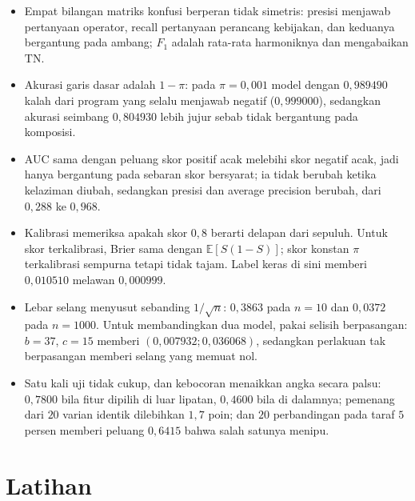 \begin{ringkasan}
\begin{itemize}
  \item Empat bilangan matriks konfusi berperan tidak simetris: presisi menjawab
        pertanyaan operator, recall pertanyaan perancang kebijakan, dan keduanya
        bergantung pada ambang; $F_1$ adalah rata-rata harmoniknya dan mengabaikan
        $\mathrm{TN}$.
  \item Akurasi garis dasar adalah $1-\pi$: pada $\pi=0{,}001$ model dengan $0{,}989490$
        kalah dari program yang selalu menjawab negatif ($0{,}999000$), sedangkan akurasi
        seimbang $0{,}804930$ lebih jujur sebab tidak bergantung pada komposisi.
  \item AUC sama dengan peluang skor positif acak melebihi skor negatif acak, jadi hanya
        bergantung pada sebaran skor bersyarat; ia tidak berubah ketika kelaziman diubah,
        sedangkan presisi dan average precision berubah, dari $0{,}288$ ke $0{,}968$.
  \item Kalibrasi memeriksa apakah skor $0{,}8$ berarti delapan dari sepuluh. Untuk skor
        terkalibrasi, Brier sama dengan $\mathbb{E}[S(1-S)]$; skor konstan $\pi$
        terkalibrasi sempurna tetapi tidak tajam. Label keras di sini memberi
        $0{,}010510$ melawan $0{,}000999$.
  \item Lebar selang menyusut sebanding $1/\sqrt n$: $0{,}3863$ pada $n=10$ dan $0{,}0372$
        pada $n=1000$. Untuk membandingkan dua model, pakai selisih berpasangan: $b=37$,
        $c=15$ memberi $(0{,}007932;0{,}036068)$, sedangkan perlakuan tak berpasangan
        memberi selang yang memuat nol.
  \item Satu kali uji tidak cukup, dan kebocoran menaikkan angka secara palsu: $0{,}7800$
        bila fitur dipilih di luar lipatan, $0{,}4600$ bila di dalamnya; pemenang dari
        $20$ varian identik dilebihkan $1{,}7$ poin; dan $20$ perbandingan pada taraf $5$
        persen memberi peluang $0{,}6415$ bahwa salah satunya menipu.
\end{itemize}
\end{ringkasan}

\section{Latihan}


